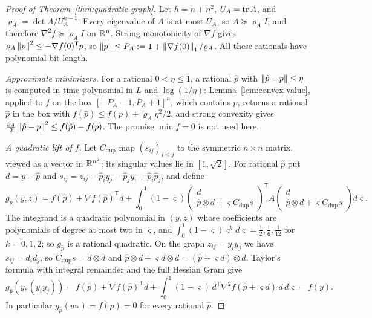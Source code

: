 \begin{proof}[Proof of Theorem~\ref{thm:quadratic-graph}]
Let $h=n+n^2$, $U_A=\operatorname{tr} A$, and $\varrho_A=\det A/U_A^{h-1}$. Every eigenvalue
of $A$ is at most $U_A$, so $A\succeq\varrho_AI$, and therefore
$\nabla^2f\succeq\varrho_AI$ on $\mathbb R^n$. Strong monotonicity of $\nabla f$ gives
$\varrho_A\left\lVert p\right\rVert^2\le-\nabla f(0)^{\mathsf T}p$, so
$\left\lVert p\right\rVert\le P_A:=1+\left\lVert\nabla f(0)\right\rVert_1/\varrho_A$. All these rationals have
polynomial bit length.

\emph{Approximate minimizers.} For a rational $0<\eta\le1$, a rational
$\hat p$ with $\left\lVert\hat p-p\right\rVert\le\eta$ is computed in time polynomial in $L$
and $\log(1/\eta)$: Lemma~\ref{lem:convex-value}, applied to $f$ on the box
$[-P_A-1,P_A+1]^n$, which contains $p$, returns a rational $\hat p$ in the box
with $f(\hat p)\le f(p)+\varrho_A\eta^2/2$, and strong convexity gives
$\frac{\varrho_A}2\left\lVert\hat p-p\right\rVert^2\le f(\hat p)-f(p)$. The promise
$\min f=0$ is not used here.

\emph{A quadratic lift of $f$.} Let $C_{\mathrm{dup}}$ map
$(s_{ij})_{i\le j}$ to the symmetric $n\times n$ matrix, viewed as a vector
in $\mathbb R^{n^2}$; its singular values lie in $[1,\sqrt2]$. For rational $\hat p$
put $d=y-\hat p$ and $s_{ij}=z_{ij}-\hat p_iy_j-\hat p_jy_i+\hat p_i\hat p_j$,
and define
\[
 g_{\hat p}(y,z)=f(\hat p)+\nabla f(\hat p)^{\mathsf T}d
 +\int_0^1(1-\varsigma)
 \begin{pmatrix}d\\ \hat p\otimes d+\varsigma C_{\mathrm{dup}}s\end{pmatrix}^{\mathsf T}
 A\begin{pmatrix}d\\ \hat p\otimes d+\varsigma C_{\mathrm{dup}}s\end{pmatrix}
 d\varsigma .
\]
The integrand is a quadratic polynomial in $(y,z)$ whose coefficients are
polynomials of degree at most two in $\varsigma$, and
$\int_0^1(1-\varsigma)\varsigma^kd\varsigma=\tfrac12,\tfrac16,\tfrac1{12}$ for
$k=0,1,2$; so $g_{\hat p}$ is a rational quadratic. On the graph
$z_{ij}=y_iy_j$ we have $s_{ij}=d_id_j$, so $C_{\mathrm{dup}}s=d\otimes d$ and
$\hat p\otimes d+\varsigma d\otimes d=(\hat p+\varsigma d)\otimes d$. Taylor's
formula with integral remainder and the full Hessian Gram give
\[
 g_{\hat p}(y,(y_iy_j))=f(\hat p)+\nabla f(\hat p)^{\mathsf T}d
 +\int_0^1(1-\varsigma)\,d^{\mathsf T}\nabla^2f(\hat p+\varsigma d)\,d\,d\varsigma
 =f(y).
\]
In particular $g_{\hat p}(w_*)=f(p)=0$ for every rational $\hat p$.


\end{proof}
